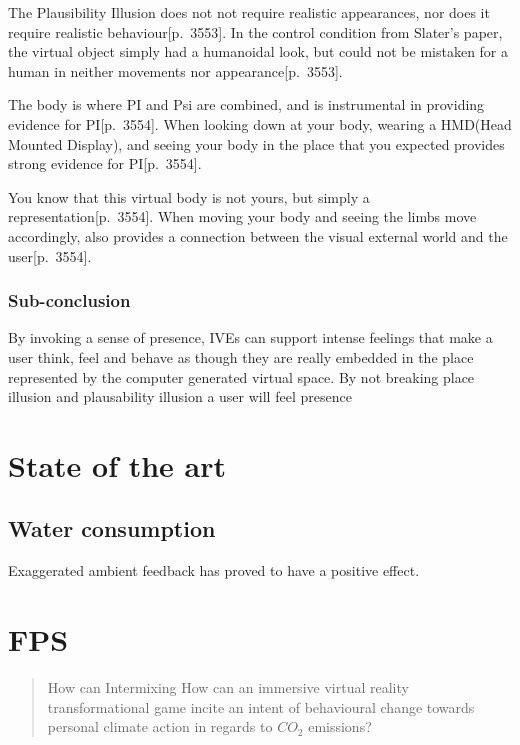     The Plausibility Illusion does not not require realistic appearances, nor does it require realistic behaviour\citep{vrImmersion}[p.~3553]. In the control condition from Slater's paper, the virtual object simply had a humanoidal look, but could not be mistaken for a human in neither movements nor appearance\citep{vrImmersion}[p.~3553].
    
    The body is where PI and Psi are combined, and is instrumental in providing evidence for PI\citep{vrImmersion}[p.~3554]. When looking down at your body, wearing a HMD(Head Mounted Display), and seeing your body in the place that you expected provides strong evidence for PI\citep{vrImmersion}[p.~3554].
    
    You know that this virtual body is not yours, but simply a representation\citep{vrImmersion}[p.~3554]. When moving your body and seeing the limbs move accordingly, also provides a connection between the visual external world and the user\citep{vrImmersion}[p.~3554].
    
    \subsubsection{Sub-conclusion}
    By invoking a sense of presence, IVEs can support intense feelings that make a user think, feel and behave as though they are really embedded in the place represented by the computer generated virtual space.
    By not breaking place illusion and plausability illusion a user will feel presence
    
    
\section{State of the art}
    \subsection{Water consumption}
    Exaggerated ambient feedback has proved to have a positive effect.\cite{waterConsumption}


\section{FPS}\label{sec:FPS}
\begin{quote}
    How can Intermixing
    How can an immersive virtual reality transformational game incite an intent of behavioural change towards personal climate action in regards to $CO_{2}$ emissions? 
\end{quote}

